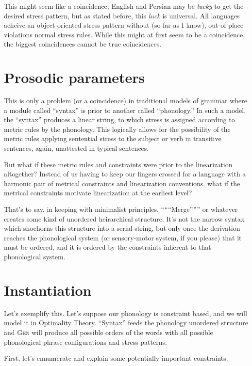 \documentclass{article}
\begin{document}
This might seem like a coincidence; English and Persian may be \emph{lucky} to get the desired stress pattern, but as stated before, this \emph{luck} is universal. All languages acheive an object-oriented stress pattern without (so far as I know), out-of-place violations normal stress rules. While this might at first seem to be a coincidence, the biggest coincidences cannot be true coincidences.

\section{Prosodic parameters}

This is only a problem (or a coincidence) in traditional models of grammar where a module called ``syntax'' is prior to another called ``phonology.'' In such a model, the ``syntax'' produces a linear string, to which stress is assigned according to metric rules by the phonology. This logically allows for the possibility of the metric rules applying sentential stress to the subject or verb in transitive sentences, again, unattested in typical sentences.

But what if these metric rules and constraints were prior to the linearization altogether? Instead of us having to keep our fingers crossed for a language with a harmonic pair of metrical constraints and linearization conventions, what if the metrical constraints motivate linearization at the earliest level?

That's to say, in keeping with minimalist principles, ``````Merge'''''' or whatever creates some kind of unordered heirarchical structure. It's not the narrow syntax which shoehorns this structure into a serial string, but only once the derivation reaches the phonological system (or sensory-motor system, if you please) that it must be ordered, and it is ordered by the constraints inherent to that phonological system.

\section{Instantiation}

Let's exemplify this. Let's suppose our phonology is constraint based, and we will model it in Optimality Theory. ``Syntax'' feeds the phonology unordered structure and \textsc{Gen} will produce all possible orders of the words with all possible phonological phrase configurations and stress patterns.

First, let's ennumerate and explain some potentially important constraints.
\end{document}
